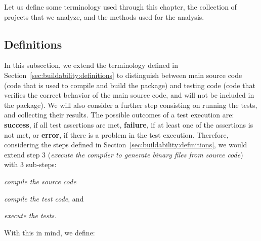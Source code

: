 
Let us define some terminology used through this chapter, the collection of projects that we analyze, and the methods used for the analysis.

\subsection{Definitions}
\label{subsec:definitions}

In this subsection, we extend the terminology defined in Section~\ref{sec:buildability:definitions} to distinguish between main source code (code that is used to compile and build the package) and testing code (code that verifies the correct behavior of the main source code, and will not be included in the package). 
We will also consider a further step consisting on running the tests, and collecting their results. 
The possible outcomes of a test execution are: \textbf{success}, if all test assertions are met, \textbf{failure}, if at least one of the assertions is not met, or \textbf{error}, if there is a problem in the test execution.
Therefore, considering the steps defined in Section~\ref{sec:buildability:definitions}, we would extend step 3 (\textit{execute the compiler to generate binary files from source code}) with 3 sub-steps:
\begin{inparaenum}[\bf(1)]
    \item \textit{compile the source code}
    \item \textit{compile the test code}, and
    \item \textit{execute the tests}.
\end{inparaenum}
With this in mind, we define:


